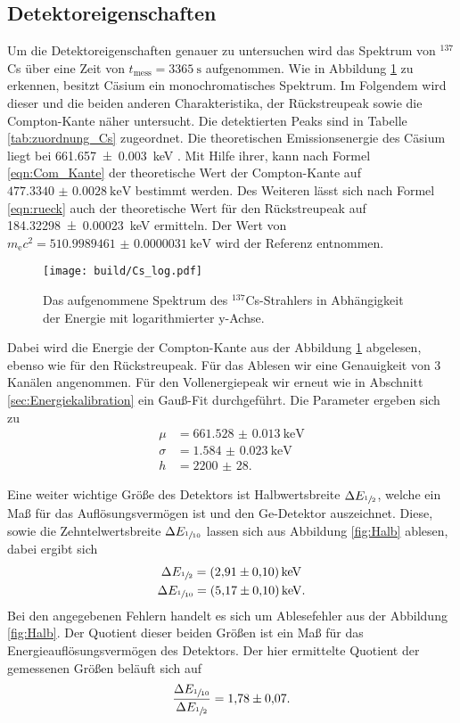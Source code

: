 \subsection{Detektoreigenschaften}
\label{sec:Detektoreigenschaften}
Um die Detektoreigenschaften genauer zu untersuchen wird das Spektrum von ${}^{137}$Cs über eine Zeit
von $t_\text{mess} = \SI{3365}{\second}$ aufgenommen. Wie in Abbildung \ref{fig:Cs_log} zu erkennen, besitzt Cäsium
ein monochromatisches Spektrum. Im Folgendem wird dieser und die beiden anderen Charakteristika, der Rückstreupeak
sowie die Compton-Kante näher untersucht. Die detektierten Peaks sind in Tabelle \ref{tab:zuordnung_Cs} zugeordnet. 
Die theoretischen Emissionsenergie des Cäsium liegt bei \SI{661.657(3)}{\kilo\electronvolt} \cite{referenz1}. Mit Hilfe
ihrer, kann nach Formel \ref{eqn:Com_Kante} der theoretische Wert der Compton-Kante auf $\SI{477.3340(28)}{\kilo\electronvolt}$
bestimmt werden. Des Weiteren lässt sich nach Formel \ref{eqn:rueck} auch der theoretische Wert für den Rückstreupeak
auf \SI{184.32298(23)}{\kilo\electronvolt} ermitteln. Der Wert von $m_\text{e} c^2 = \SI{510.9989461(31)}{\kilo\electronvolt}$ wird 
der Referenz \cite{codata} entnommen. 
\begin{figure}[htb]
 \centering
 \texttt{[image: build/Cs\_log.pdf]}
 \caption{Das aufgenommene Spektrum des ${}^{137}$Cs-Strahlers in Abhängigkeit der Energie mit logarithmierter y-Achse.}
 \label{fig:Cs_log}
\end{figure}

Dabei wird die Energie der Compton-Kante aus der Abbildung \ref{fig:Cs_log} abgelesen, ebenso wie für den 
Rückstreupeak. Für das Ablesen wir eine Genauigkeit von \num{3} Kanälen angenommen.
Für den Vollenergiepeak wir erneut wie in Abschnitt \ref{sec:Energiekalibration} ein Gauß-Fit durchgeführt.
Die Parameter ergeben sich zu
\begin{align*}
  \mu &= \SI{661.528(13)}{\kilo\electronvolt} \\
  \sigma &= \SI{1.584(23)}{\kilo\electronvolt} \\
  h &= \num{2200(28)}.
\end{align*}

Eine weiter wichtige Größe des Detektors ist Halbwertsbreite $\Delta E_{\sfrac{1}{2}}$, welche ein Maß für das Auflösungsvermögen ist
und den Ge-Detektor auszeichnet. Diese, sowie die Zehntelwertsbreite $\Delta E_{\sfrac{1}{10}}$ lassen sich aus Abbildung \ref{fig:Halb} ablesen, 
dabei ergibt sich 
\begin{gather*}
  \Delta E_{\sfrac{1}{2}} = \SI{2.91(10)}{\kilo\electronvolt} \\
  \Delta E_{\sfrac{1}{10}} = \SI{5.17(10)}{\kilo\electronvolt}.
\end{gather*}
Bei den angegebenen Fehlern handelt es sich um Ablesefehler aus der Abbildung \ref{fig:Halb}.
Der Quotient dieser beiden Größen ist ein Maß für das Energieauflösungsvermögen des Detektors. Der hier ermittelte 
Quotient der gemessenen Größen beläuft sich auf
\begin{equation*}
  \frac{\Delta E_{\sfrac{1}{10}}}{\Delta E_{\sfrac{1}{2}}} = \num{1.78(7)}.
\end{equation*}

